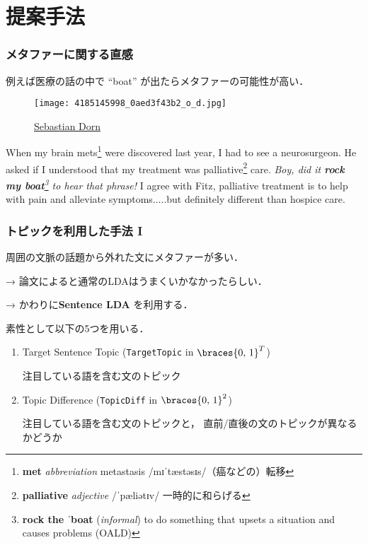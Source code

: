 \documentclass[11pt,usepdftitle=false]{beamer}
\let\phonetic\relax
\newcommand\metaphorical[1]{\textcolor{sRed}{\textbf{#1}}}
\newcommand\abbr[1]{\textcolor{sForestGreen}{#1}}
\newcommand\headword[1]{\textcolor{sDarkBlue}{\textbf{#1}}}
\newcommand\misc[1]{\textcolor{sLightGray2}{(\textit{#1})}}
\let\oldcitep=\citep
\renewcommand\citep[1]{\hyperlink{#1}{\oldcitep{#1}}}
\begin{document}
\section{提案手法}
\begin{frame}
\frametitle{メタファーに関する直感}
例えば医療の話の中で “boat” が出たらメタファーの可能性が高い．
\begin{leftbar}
    \begin{wrapfigure}[7]{r}{0.3\linewidth}
    \centering
    \texttt{[image: 4185145998\_0aed3f43b2\_o\_d.jpg]}
    \captionsetup{font=scriptsize}
    \caption*{\href{https://www.flickr.com/photos/sebadorn/4185145998/in/photolist-7nPY6C-8jDzHw-pn8eY3-HR3vBv-o1HZQF-oph6dL-bCc6C4-9v3Bep-f7D7Vh-4VP8Cr-pgiMKA-6UFukX-dChf6J-oXFcG9-nSLS9D-6mn7RN-3aX8tL-7CEmyn-7KeW2i-h21Dgq-nrT8ZS-nhpe7T-rKYLm-6VskiC-rGyU3e-8gPNfW-8EmjdH-neBGnK-g7svjC-5b5hLj-gj5MDe-aEW8TE-fjHVzv-ccemKm-7B6sf2-4A74GB-norgrd-6QWgS3-rwZs8y-eTbNEs-9AJnaX-5ZHyDc-7iH9bq-7Sx6JX-519bvM-4xZSgU-4sVnuU-6w2yUX-8KTXzr-nkPCbj}{\raisebox{-0.8pt}{\copyright} Sebastian Dorn}}
\end{wrapfigure}
When my brain mets\footnote{\headword{met} \textit{abbreviation} \abbr{metastasis} {\phonetic /mɪˈtæstəsɪs/}（癌などの）転移} were discovered last year, I had to see a neurosurgeon.
    He asked if I understood that my treatment was palliative\footnote{\headword{palliative} \textit{adjective} {\phonetic /ˈpæliətɪv/} 一時的に和らげる} care.
    \textit{Boy, did it \metaphorical{rock my boat}\footnote{\normalfont \headword{rock the ˈboat} \misc{informal} to do something that upsets a situation and causes problems (OALD)} to hear that phrase!}
    I agree with Fitz, palliative treatment is to help with pain and alleviate symptoms.....but definitely different than hospice care.
\end{leftbar}
\end{frame}

\begin{frame}
\frametitle{トピックを利用した手法 I}
周囲の文脈の話題から外れた文にメタファーが多い．

→ 論文によると通常のLDAはうまくいかなかったらしい．

→ かわりに\textbf{Sentence LDA} \citep{jo2011}を利用する．

\bigskip

素性として以下の5つを用いる．
\begin{enumerate}
    \item Target Sentence Topic (\texttt{TargetTopic} in $\braces{0,\,1}^T$)

        注目している語を含む文のトピック

    \item Topic Difference (\texttt{TopicDiff} in  $\braces{0,\,1}^2$)

        注目している語を含む文のトピックと，
        直前/直後の文のトピックが異なるかどうか

\end{enumerate}
\end{frame}
\end{document}
